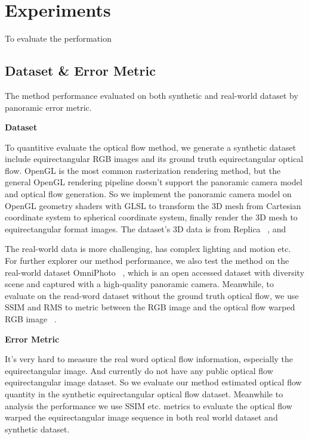 \section{Experiments}\label{sec:exp}

To evaluate the performation

\subsection{Dataset \& Error Metric}

The method performance evaluated on both synthetic and real-world dataset by panoramic error metric.

\textbf{Dataset}

To quantitive evaluate the optical flow method, we generate a synthetic dataset include equirectangular RGB images and its ground truth equirectangular optical flow.
OpenGL is the most common rasterization rendering method, but the general OpenGL rendering pipeline doesn't support the panoramic camera model and optical flow generation.
So we implement the panoramic camera model on OpenGL geometry shaders with GLSL to transform the 3D mesh from Cartesian coordinate system to spherical coordinate system, finally render the 3D mesh to equirectangular format images.
The dataset's 3D data is from Replica ~\cite{??}, and 

The real-world data is more challenging, has complex lighting and motion etc. 
For further explorer our method performance,  we also test the method on the real-world dataset OmniPhoto ~\cite{??}, which is an open accessed dataset with diversity scene and captured with a high-quality panoramic camera.
Meanwhile, to evaluate on the read-word dataset without the ground truth optical flow, we use SSIM and RMS to metric between the RGB image and the optical flow warped RGB image ~\cite{???}.

\textbf{Error Metric}

It's very hard to measure the real word optical flow information, especially the equirectangular image. 
And currently do not have any public optical flow equirectangular image dataset.
So we evaluate our method estimated optical flow quantity in the synthetic equirectangular optical flow dataset.
Meanwhile to analysis the performance we use SSIM etc. metrics to evaluate the optical flow warped the equirectangular image sequence in both real world dataset and synthetic dataset.

